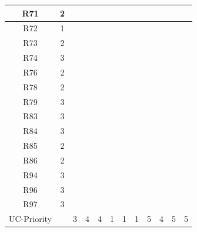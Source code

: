 \documentclass[12pt]{article}
\begin{document}
\begin{longtable}{|c|c|c|c|c|c|c|c|c|c|c|c|}
		\hline
		R71         & 2          &           &           &           &           &           &           &           &           &           &           \\
		\hline
		R72         & 1          &           &           &           &           &           &           &           &           &           &           \\
		\hline
		R73         & 2          &           &           &           &           &           &           &           &           &           &           \\
		\hline
		R74         & 3          &           &           &           &           &           &           &           &           &           &           \\
		\hline
		R76         & 2          &           &           &           &           &           &           &           &           &           &           \\
		\hline
		R78         & 2          & \ding{51} &           &           &           &           &           &           &           &           &           \\
		\hline
		R79         & 3          &           &           &           &           &           &           &           &           &           &           \\
		\hline
		R83         & 3          &           &           &           &           &           &           &           &           &           &           \\
		\hline
		R84         & 3          &           &           &           &           &           &           &           &           &           &           \\
		\hline
		R85         & 2          &           &           &           &           &           &           &           &           &           &           \\
		\hline
		R86         & 2          &           &           &           &           &           &           &           &           &           &           \\
		\hline
		R94         & 3          &           &           &           &           &           &           &           &           &           &           \\
		\hline
		R96         & 3          &           &           &           &           &           &           &           &           &           &           \\
		\hline
		R97         & 3          &           &           &           &           &           &           &           &           &           &           \\
		\hline
		UC-Priority &            & 3         & 4         & 4         & 1         & 1         & 1         & 5         & 4         & 5         & 5         \\
		\hline
	\end{longtable}
\end{document}
